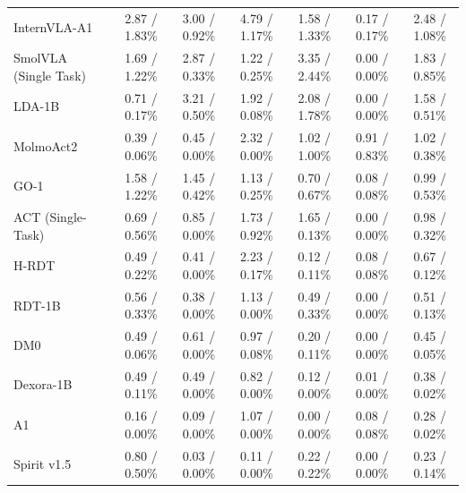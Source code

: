 \begin{table}[!t]
{\begin{tabular}{l|c|c|c|c|c|c}
InternVLA-A1~\citep{cai2026internvla} 
& 2.87 / 1.83\% 
& 3.00 / 0.92\% 
& 4.79 / 1.17\% 
& 1.58 / 1.33\% 
& 0.17 / 0.17\% 
& 2.48 / 1.08\% \\

SmolVLA (Single Task)~\citep{shukor2025smolvla} 
& 1.69 / 1.22\% 
& 2.87 / 0.33\% 
& 1.22 / 0.25\% 
& 3.35 / 2.44\% 
& 0.00 / 0.00\% 
& 1.83 / 0.85\% \\

LDA-1B~\citep{lyu2026lda} 
& 0.71 / 0.17\% 
& 3.21 / 0.50\% 
& 1.92 / 0.08\% 
& 2.08 / 1.78\% 
& 0.00 / 0.00\% 
& 1.58 / 0.51\% \\

MolmoAct2~\citep{fang2026molmoact2} 
& 0.39 / 0.06\% 
& 0.45 / 0.00\% 
& 2.32 / 0.00\% 
& 1.02 / 1.00\% 
& 0.91 / 0.83\% 
& 1.02 / 0.38\% \\

GO-1~\citep{bu2025agibot} 
& 1.58 / 1.22\% 
& 1.45 / 0.42\% 
& 1.13 / 0.25\% 
& 0.70 / 0.67\% 
& 0.08 / 0.08\% 
& 0.99 / 0.53\% \\

ACT (Single-Task)~\citep{zhao2023learning} 
& 0.69 / 0.56\% 
& 0.85 / 0.00\% 
& 1.73 / 0.92\% 
& 1.65 / 0.13\% 
& 0.00 / 0.00\% 
& 0.98 / 0.32\% \\

H-RDT~\citep{bi2026h} 
& 0.49 / 0.22\% 
& 0.41 / 0.00\% 
& 2.23 / 0.17\% 
& 0.12 / 0.11\% 
& 0.08 / 0.08\% 
& 0.67 / 0.12\% \\

RDT-1B~\citep{liu2025rdt} 
& 0.56 / 0.33\% 
& 0.38 / 0.00\% 
& 1.13 / 0.00\% 
& 0.49 / 0.33\% 
& 0.00 / 0.00\% 
& 0.51 / 0.13\% \\

DM0~\citep{yu2026dm0} 
& 0.49 / 0.06\% 
& 0.61 / 0.00\% 
& 0.97 / 0.08\% 
& 0.20 / 0.11\% 
& 0.00 / 0.00\% 
& 0.45 / 0.05\% \\

Dexora-1B~\citep{zhang2026dexora} 
& 0.49 / 0.11\% 
& 0.49 / 0.00\% 
& 0.82 / 0.00\% 
& 0.12 / 0.00\% 
& 0.01 / 0.00\% 
& 0.38 / 0.02\% \\

A1~\citep{zhang2026a1} 
& 0.16 / 0.00\% 
& 0.09 / 0.00\% 
& 1.07 / 0.00\% 
& 0.00 / 0.00\% 
& 0.08 / 0.08\% 
& 0.28 / 0.02\% \\

Spirit v1.5~\citep{spiritspirit} 
& 0.80 / 0.50\% 
& 0.03 / 0.00\% 
& 0.11 / 0.00\% 
& 0.22 / 0.22\% 
& 0.00 / 0.00\% 
& 0.23 / 0.14\% \\


\end{tabular}}
\end{table}
